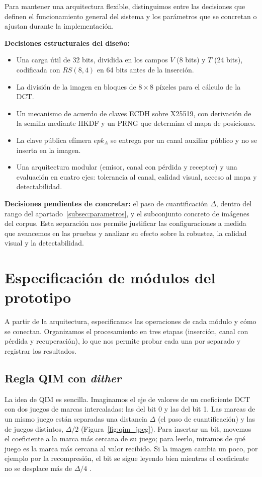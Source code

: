 \documentclass[IB]{TFUOC}%
\begin{document}
Para mantener una arquitectura flexible, distinguimos entre las decisiones que definen el funcionamiento general del sistema y los parámetros que se concretan o ajustan durante la implementación.

\textbf{Decisiones estructurales del diseño:}
\begin{itemize}
    \item Una carga útil de 32 bits, dividida en los campos $V$ (8 bits) y $T$ (24 bits), codificada con $RS(8,4)$ en 64 bits antes de la inserción.
    \item La división de la imagen en bloques de $8\times8$ píxeles para el cálculo de la DCT.
    \item Un mecanismo de acuerdo de claves ECDH sobre X25519, con derivación de la semilla mediante HKDF y un PRNG que determina el mapa de posiciones.
    \item La clave pública efímera $epk_A$ se entrega por un canal auxiliar público y no se inserta en la imagen.
    \item Una arquitectura modular (emisor, canal con pérdida y receptor) y una evaluación en cuatro ejes: tolerancia al canal, calidad visual, acceso al mapa y detectabilidad.
\end{itemize}

\textbf{Decisiones pendientes de concretar:} el paso de cuantificación $\Delta$, dentro del rango del apartado~\ref{subsec:parametros}, y el subconjunto concreto de imágenes del corpus. Esta separación nos permite justificar las configuraciones a medida que avancemos en las pruebas y analizar su efecto sobre la robustez, la calidad visual y la detectabilidad.

\section{Especificación de módulos del prototipo}
\label{sec:especificacion_modulos}

A partir de la arquitectura, especificamos las operaciones de cada módulo y cómo se conectan. Organizamos el procesamiento en tres etapas (inserción, canal con pérdida y recuperación), lo que nos permite probar cada una por separado y registrar los resultados.

\subsection{Regla QIM con \textit{dither}}
\label{subsec:regla_qim}

La idea de QIM es sencilla. Imaginamos el eje de valores de un coeficiente DCT con dos juegos de marcas intercaladas: las del bit 0 y las del bit 1. Las marcas de un mismo juego están separadas una distancia $\Delta$ (el paso de cuantificación) y las de juegos distintos, $\Delta/2$ (Figura~\ref{fig:qim_jpeg}). Para insertar un bit, movemos el coeficiente a la marca más cercana de su juego; para leerlo, miramos de qué juego es la marca más cercana al valor recibido. Si la imagen cambia un poco, por ejemplo por la recompresión, el bit se sigue leyendo bien mientras el coeficiente no se desplace más de $\Delta/4$ \cite{11}.
\end{document}
